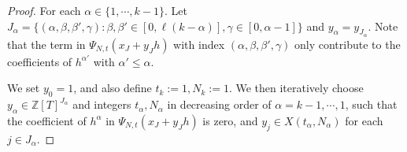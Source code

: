 \documentclass[12pt,reqno]{amsart}
\theoremstyle{plain}
\theoremstyle{definition}
\newcommand{\Z}{\mathbb{Z}}
\newcommand{\1}{\mathbf{1}}
\begin{document}
\begin{proof}
    For each $\alpha \in \{1, \cdots, k - 1\}$. Let $J_{\alpha} = \{(\alpha, \beta, \beta', \gamma):\beta,\beta'\in [0,\ell(k-\alpha)], \gamma\in [0,\alpha-1]\}$ and $y_{\alpha} = y_{J_{\alpha}}$. Note that the term in $\Psi_{N,t}(x_J + y_J h)$ with index $(\alpha, \beta, \beta', \gamma)$ only contribute to the coefficients of $h^{\alpha'}$ with $\alpha' \leq \alpha$. 
    
    We set $y_0 = 1$, and also define $t_k := 1, N_k := 1$. We then iteratively choose $y_{\alpha} \in \Z[T]^{J_{\alpha}}$ and integers $t_{\alpha}, N_{\alpha}$ in decreasing order of $\alpha = k - 1 , \cdots, 1$, such that the coefficient of $h^{\alpha}$ in $\Psi_{N,t}(x_J + y_J h) $ is zero, and $y_{j} \in X(t_{\alpha}, N_{\alpha})$ for each $j \in J_{\alpha}$.
    

\end{proof}
\end{document}
